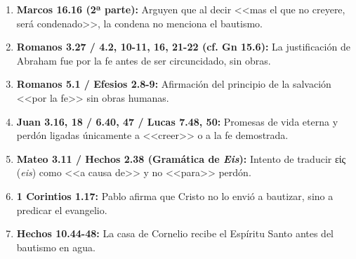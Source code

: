 \documentclass[12pt]{report}
\begin{document}
	\begin{subminibloque}
		\begin{enumerate}
			\item \textbf{Marcos 16.16 (2ª parte):} Arguyen que al decir <<mas el que no creyere, será condenado>>, la condena no menciona el bautismo.
			\item \textbf{Romanos 3.27 / 4.2, 10-11, 16, 21-22 (cf. Gn 15.6):} La justificación de Abraham fue por la fe antes de ser circuncidado, sin obras.
			\item \textbf{Romanos 5.1 / Efesios 2.8-9:} Afirmación del principio de la salvación <<por la fe>> sin obras humanas.
			\item \textbf{Juan 3.16, 18 / 6.40, 47 / Lucas 7.48, 50:} Promesas de vida eterna y perdón ligadas únicamente a <<creer>> o a la fe demostrada.
			\item \textbf{Mateo 3.11 / Hechos 2.38 (Gramática de \textit{Eis}):} Intento de traducir \textgreek{εἰς} (\textit{eis}) como <<a causa de>> y no <<para>> perdón.
			\item \textbf{1 Corintios 1.17:} Pablo afirma que Cristo no lo envió a bautizar, sino a predicar el evangelio.
			\item \textbf{Hechos 10.44-48:} La casa de Cornelio recibe el Espíritu Santo antes del bautismo en agua.
		\end{enumerate}
	\end{subminibloque}
	
\end{document}
